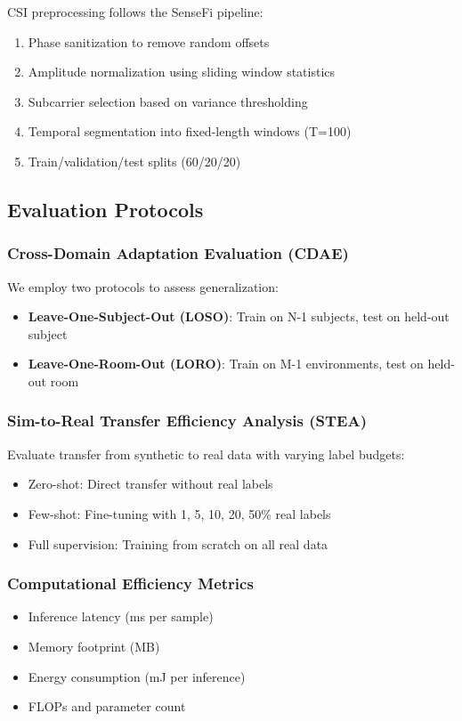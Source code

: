 \documentclass[journal]{IEEEtran}
\begin{document}
CSI preprocessing follows the SenseFi pipeline:
\begin{enumerate}
\item Phase sanitization to remove random offsets
\item Amplitude normalization using sliding window statistics
\item Subcarrier selection based on variance thresholding
\item Temporal segmentation into fixed-length windows (T=100)
\item Train/validation/test splits (60/20/20)
\end{enumerate}

\subsection{Evaluation Protocols}

\subsubsection{Cross-Domain Adaptation Evaluation (CDAE)}
We employ two protocols to assess generalization:
\begin{itemize}
\item \textbf{Leave-One-Subject-Out (LOSO)}: Train on N-1 subjects, test on held-out subject
\item \textbf{Leave-One-Room-Out (LORO)}: Train on M-1 environments, test on held-out room
\end{itemize}

\subsubsection{Sim-to-Real Transfer Efficiency Analysis (STEA)}
Evaluate transfer from synthetic to real data with varying label budgets:
\begin{itemize}
\item Zero-shot: Direct transfer without real labels
\item Few-shot: Fine-tuning with {1, 5, 10, 20, 50}\% real labels
\item Full supervision: Training from scratch on all real data
\end{itemize}

\subsubsection{Computational Efficiency Metrics}
\begin{itemize}
\item Inference latency (ms per sample)
\item Memory footprint (MB)
\item Energy consumption (mJ per inference)
\item FLOPs and parameter count
\end{itemize}
\end{document}
